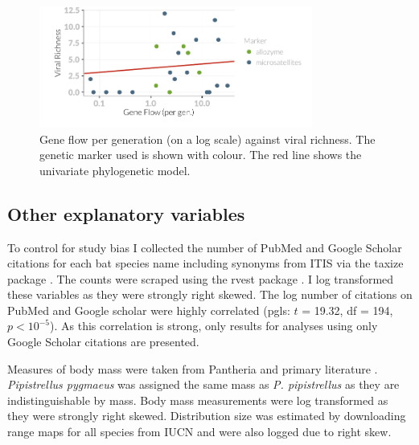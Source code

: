\begin{knitrout}\footnotesize
{}\color{fgcolor}\begin{figure}[t]

{\centering \includegraphics[width=0.8\textwidth]{figure/fstRawData-1} 

}

\caption[Gene flow per generation (on a log scale) against viral richness]{Gene flow per generation (on a log scale) against viral richness. The genetic marker used is shown with colour. The red line shows the univariate phylogenetic model.}\label{fig:fstRawData}
\end{figure}


\end{knitrout}

\subsection{Other explanatory variables}

To control for study bias I collected the number of PubMed and Google Scholar citations for each bat species name including synonyms from ITIS \cite{itis} via the taxize package \cite{chamberlain2013taxize}.
The counts were scraped using the rvest package \cite{rvest}.
I log transformed these variables as they were strongly right skewed.
The log number of citations on PubMed and Google scholar were highly correlated (pgls: $t$ = 19.32, df = 194, $p < 10^{-5}$).
As this correlation is strong, only results for analyses using only Google Scholar citations are presented.

Measures of body mass were taken from Pantheria \cite{jones2009pantheria} and primary literature \cite{canals2005relative, arita1993rarity, lopez2014echolocation, orr2013does, lim2001bat, aldridge1987turning, ma2003dietary, owen2003home, henderson2008movements, heaney2012nyctalus, oleksy2015high, zhang2009recent}. 
\emph{Pipistrellus pygmaeus} was assigned the same mass as \emph{P. pipistrellus} as they are indistinguishable by mass.
Body mass measurements were log transformed as they were strongly right skewed.
Distribution size was estimated by downloading range maps for all species from IUCN \cite{iucn} and were also logged due to right skew.



